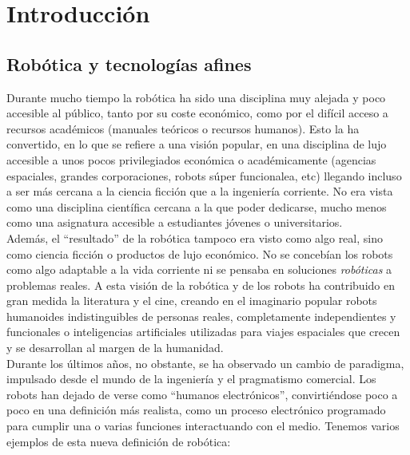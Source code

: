\chapter{Introducción}\label{cap:introduccion}

\section{Robótica y tecnologías afines}\label{sec:contextoIntroduccion}
Durante mucho tiempo la robótica ha sido una disciplina muy alejada y poco accesible al público, tanto por su coste económico, como por el difícil acceso a recursos académicos (manuales teóricos o recursos humanos). Esto la ha convertido, en lo que se refiere a una visión popular, en una disciplina de lujo accesible a unos pocos privilegiados económica o académicamente (agencias espaciales, grandes corporaciones, robots súper funcionalea, etc) llegando incluso a ser más cercana a la ciencia ficción que a la ingeniería corriente. No era vista como una disciplina científica cercana a la que poder dedicarse, mucho menos como una asignatura accesible a estudiantes jóvenes o universitarios. \\
Además, el  ``resultado'' de la robótica tampoco era visto como algo real, sino como ciencia ficción o productos de lujo económico. No se concebían los robots como algo adaptable a la vida corriente ni se pensaba en soluciones \textit{robóticas} a problemas reales. A esta visión de la robótica y de los robots ha contribuido en gran medida la literatura y el cine, creando en el imaginario popular robots humanoides indistinguibles de personas reales, completamente independientes y funcionales o inteligencias artificiales utilizadas para viajes espaciales que crecen y se desarrollan al margen de la humanidad.\\

Durante los últimos años, no obstante, se ha observado un cambio de paradigma, impulsado desde el mundo de la ingeniería y el pragmatismo comercial. Los robots han dejado de verse como ``humanos electrónicos'', convirtiéndose poco a poco en una definición más realista, como un proceso electrónico programado para cumplir una o varias funciones interactuando con el medio. Tenemos varios ejemplos de esta nueva definición de robótica:


